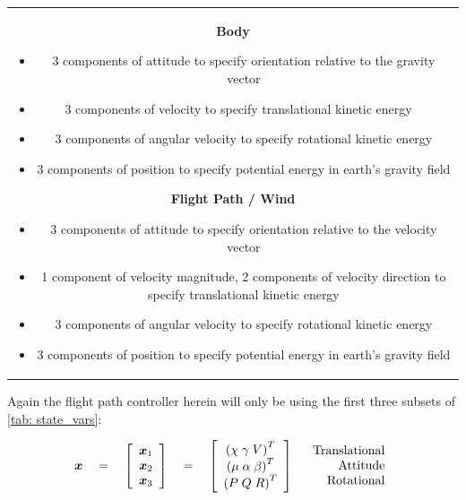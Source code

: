 \documentclass[12pt]{ucthesis}
\begin{document}
\begin{table}[H]
\begin{tabular}{c}
			{\begin{minipage}[t]{0.5\linewidth}
			\textbf{Body}
			\begin{itemize}[labelindent=5pt,leftmargin=*,noitemsep,nosep]%
				\raggedright
				\item 3 components of attitude to specify orientation relative to the gravity vector
				\item 3 components of velocity to specify translational kinetic energy \newline ~
				\item 3 components of angular velocity to specify rotational kinetic energy
				\item 3 components of position to specify potential energy in earth's gravity field
			\end{itemize}
			\end{minipage}
			\hspace{0.025\linewidth}
			\begin{minipage}[t]{0.5\linewidth}
			\textbf{Flight Path / Wind}
			\begin{itemize}[labelindent=5pt,leftmargin=*,noitemsep,nosep]%
				\raggedright
				\item 3 components of attitude to specify orientation relative to the velocity vector
				\item 1 component of velocity magnitude, 2 components of velocity direction to specify translational kinetic energy
				\item 3 components of angular velocity to specify rotational kinetic energy
				\item 3 components of position to specify potential energy in earth's gravity field
			\end{itemize}
			\end{minipage}
			\label{list: state_vars}}
			
		\end{tabular}
	
	\end{table}

\noindent Again the flight path controller herein will only be using the first three subsets of \autoref{tab: state_vars}:

	\begin{align}
		\boldsymbol{x} \quad=\quad 
		\left[ \begin{array}{c} \boldsymbol{x}_1 \\ \boldsymbol{x}_2 \\ \boldsymbol{x}_3  \end{array} \right] \quad=\quad 
		\left[ \begin{array}{c} \left( \chi 	\; \gamma 	\; V 		\right)^T \\ 
								\left( \mu 		\; \alpha 	\; \beta 	\right)^T \\ 
								\left( P 		\; Q 		\; R 		\right)^T \end{array} \right] \quad
		\begin{array}{r} \text{Translational}	\\ \text{Attitude} \\ \text{Rotational} \end{array}
		\label{eqn: x}
	\end{align}
\end{document}
